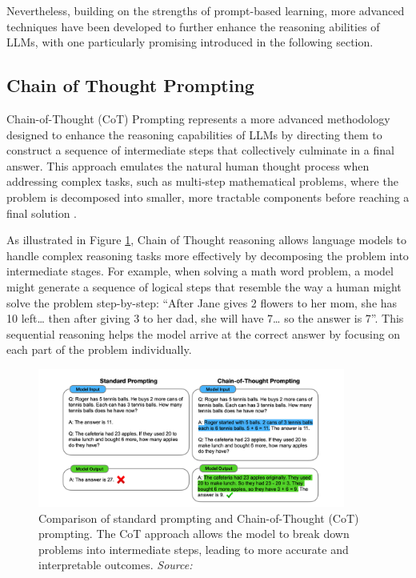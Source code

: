 Nevertheless, building on the strengths of prompt-based learning, more advanced techniques have been developed to further enhance the reasoning abilities of LLMs, with one particularly promising introduced in the following section.

\subsection{Chain of Thought Prompting}

Chain-of-Thought (CoT) Prompting represents a more advanced methodology designed to enhance the reasoning capabilities of LLMs by directing them to construct a sequence of intermediate steps that collectively culminate in a final answer. This approach emulates the natural human thought process when addressing complex tasks, such as multi-step mathematical problems, where the problem is decomposed into smaller, more tractable components before reaching a final solution \cite{wei2022chain}.

As illustrated in Figure \ref{fig:cot_reasoning}, Chain of Thought reasoning allows language models to handle complex reasoning tasks more effectively by decomposing the problem into intermediate stages. For example, when solving a math word problem, a model might generate a sequence of logical steps that resemble the way a human might solve the problem step-by-step: “After Jane gives 2 flowers to her mom, she has 10 left… then after giving 3 to her dad, she will have 7… so the answer is 7”. This sequential reasoning helps the model arrive at the correct answer by focusing on each part of the problem individually.

\begin{figure}[h]
    \centering
    \includegraphics[width=0.9\textwidth]{images/llms/cot-resoning.png}
    \caption{Comparison of standard prompting and Chain-of-Thought (CoT) prompting. The CoT approach allows the model to break down problems into intermediate steps, leading to more accurate and interpretable outcomes. \textit{Source:} \cite{wei2022chain}}
    \label{fig:cot_reasoning}
\end{figure}

